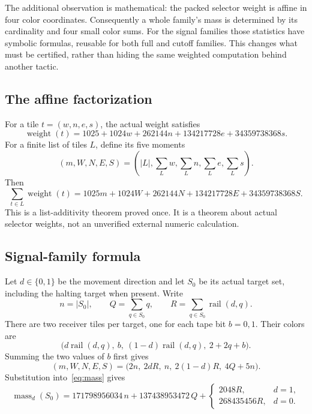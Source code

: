 \documentclass[11pt]{article}
\begin{document}
The additional observation is mathematical: the packed selector weight is affine in four color coordinates. Consequently a whole family's mass is determined by its cardinality and four small color sums. For the signal families those statistics have symbolic formulas, reusable for both full and cutoff families. This changes what must be certified, rather than hiding the same weighted computation behind another tactic.

\subsection{The affine factorization}

For a tile \(t=(w,n,e,s)\), the actual weight satisfies
\[
 \operatorname{weight}(t)=1025+1024w+262144n
              +134217728e+34359738368s.
\]
For a finite list of tiles \(L\), define its five moments
\[
 (m,W,N,E,S)=\left(|L|,\sum_L w,\sum_L n,\sum_L e,\sum_L s\right).
\]
Then
\begin{equation}\label{eq:mass}
 \sum_{t\in L}\operatorname{weight}(t)
 =1025m+1024W+262144N+134217728E+34359738368S.
\end{equation}
This is a list-additivity theorem proved once. It is a theorem about actual selector weights, not an unverified external numeric calculation.

\subsection{Signal-family formula}

Let \(d\in\{0,1\}\) be the movement direction and let \(S_0\) be its actual target set, including the halting target when present. Write
\[
 n=|S_0|,\qquad Q=\sum_{q\in S_0}q,\qquad
 R=\sum_{q\in S_0}\operatorname{rail}(d,q).
\]
There are two receiver tiles per target, one for each tape bit \(b=0,1\). Their colors are
\[
 \bigl(d\operatorname{rail}(d,q),\ b,\
       (1-d)\operatorname{rail}(d,q),\ 2+2q+b\bigr).
\]
Summing the two values of \(b\) first gives
\begin{equation}\label{eq:signal-moments}
 (m,W,N,E,S)=\bigl(2n,\ 2dR,\ n,\ 2(1-d)R,\ 4Q+5n\bigr).
\end{equation}
Substitution into~\eqref{eq:mass} gives
\begin{equation}\label{eq:signal-mass}
 \operatorname{mass}_d(S_0)=171798956034\,n+137438953472\,Q+
 \begin{cases}2048R,&d=1,\\268435456R,&d=0.\end{cases}
\end{equation}
\end{document}
